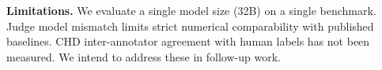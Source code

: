 \documentclass[11pt,twocolumn]{article}
\begin{document}
\textbf{Limitations.} We evaluate a single model size (32B) on a single
benchmark. Judge model mismatch limits strict numerical comparability
with published baselines. CHD inter-annotator agreement with human
labels has not been measured. We intend to address these in follow-up
work.



\end{document}
